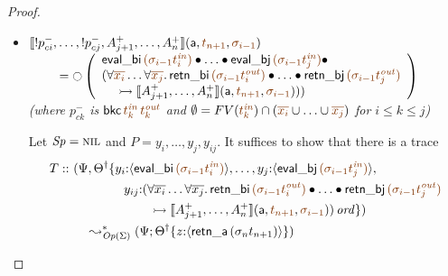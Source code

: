 \begin{proof}
\begin{itemize}
\item $\opbasic{{!}p^-_{ci},\ldots,{!}p^-_{cj},A^+_{j+1},\ldots,A^+_n}{t_{n+1}}{\sigma_{i-1}}$
  \\
  $~ \qquad = {\ocircle}\left(
      \begin{array}{l}
        {\sf eval\_bi}\,\lf{({\sigma_{i-1}}t^{\it in}_i)}
                    \fuse  \ldots \fuse
                 {\sf eval\_bj}\,\lf{({\sigma_{i-1}}t^{\it in}_j)} \fuse ~
      \\
      (\forall\lf{\overline{x_i}}\ldots\forall\lf{\overline{x_j}}.\, 
        {\sf retn\_bi}\,\lf{(\sigma_{i-1}{t^{\it out}_i})}
        \fuse \ldots \fuse 
        {\sf retn\_bj}\,\lf{(\sigma_{i-1}{t^{\it out}_j})}
      \\
      ~ \quad
      \lefti \opbasic{A^+_{j+1},\ldots,A^+_n}{t_{n+1}}{\sigma_{i-1}}))
      \end{array}\right)$\\
  {\it (where
   $p^-_{ck}$ is ${\sf bkc}\,\lf{t^{\it in}_k}\,\lf{t^{\it out}_k}$ 
   and $\emptyset = FV(\lf{t_k^{\it in}}) \cap (\lf{\overline{x_i}} \cup \ldots \cup \lf{\overline{x_j}})$ 
   for $i \leq k \leq j$)}

  \bigskip
  Let ${\it Sp} = \textsc{nil}$ and $P = y_i,\ldots,y_j,y_{ij}$. It suffices 
  to show that there is a trace
\begin{align*}
  T ::  ~  &(\Psi, \opsubst{\Theta} \tackonstart
        y_i{:}\susp{{\sf eval\_bi}\,\lf{({\sigma_{i-1}}t^{\it in}_i)}}, \ldots,
    y_j{:}\susp{{\sf eval\_bj}\,\lf{({\sigma_{i-1}}t^{\it in}_j)}},
  \\
  & \qquad\qquad y_{ij}{:}(\forall\overline{x_i}\ldots\forall\overline{x_j}.\, 
     {\sf retn\_bi}\,\lf{(\sigma_{i-1}{t^{\it out}_i})}
     \fuse \ldots \fuse 
     {\sf retn\_bj}\,\lf{(\sigma_{i-1}{t^{\it out}_j})}\\
  & \qquad\qquad\qquad
      \lefti \opbasic{A^+_{j+1},\ldots,A^+_n}{t_{n+1}}{\sigma_{i-1}})\,\mtrue
       \tackonstop)
  \\
  & \quad \leadsto^*_{\transop{\Sigma}} 
     (\Psi; \tackon{\opsubst{\Theta}}{z{:}\susp{{\sf retn\_a}\,({\sigma_n}t_{n+1})}})
\end{align*}


\end{itemize}
\end{proof}
